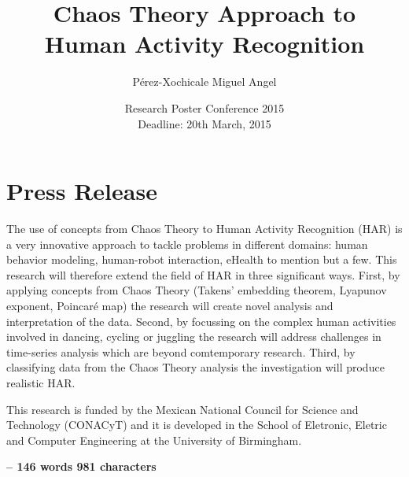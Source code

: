 \documentclass{article}
\begin{document}
\title{Chaos Theory Approach to \\ Human Activity Recognition}
\author{P\'erez-Xochicale Miguel Angel }
\date{Research Poster Conference 2015 \\  Deadline: 20th March, 2015 }

\maketitle

\section*{Press Release}

The use of concepts from Chaos Theory to Human Activity Recognition (HAR) is a very innovative 
approach to tackle problems in different domains:
human behavior modeling, human-robot interaction, eHealth to mention but a few. 
This research will therefore extend the field of HAR in three significant ways.
First, by applying concepts from Chaos Theory 
(Takens' embedding theorem, Lyapunov exponent, Poincaré map)
the research will create novel analysis
and interpretation of the data. Second, by focussing on the complex human activities
involved in dancing, cycling or juggling the research will address challenges in time-series 
analysis which are beyond comtemporary research.
Third, by classifying data from the Chaos Theory analysis the investigation will 
produce realistic HAR.

This research is funded by the Mexican National Council for Science and Technology (CONACyT) 
and it is developed in the School of Eletronic, Eletric and Computer Engineering at
the University of Birmingham.


\textbf{-- 146 words 981 characters}
\end{document}
